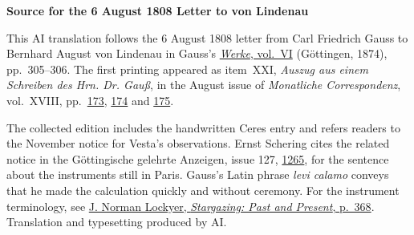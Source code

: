 \clearpage\thispagestyle{empty}
\begin{center}\textbf{Source for the 6 August 1808 Letter to von Lindenau}\end{center}
\noindent This AI translation follows the 6 August 1808 letter from Carl Friedrich Gauss to Bernhard August von Lindenau in Gauss’s \href{https://gdz.sub.uni-goettingen.de/id/PPN236007467}{\textit{Werke}, vol.~VI} (Göttingen, 1874), pp.~305--306. The first printing appeared as item~XXI, \textit{Auszug aus einem Schreiben des Hrn. Dr. Gauß}, in the August issue of \textit{Monatliche Correspondenz}, vol.~XVIII, pp.~\href{https://www.digitale-sammlungen.de/en/view/bsb10538609?page=193}{173}, \href{https://www.digitale-sammlungen.de/en/view/bsb10538609?page=194}{174} and \href{https://www.digitale-sammlungen.de/en/view/bsb10538609?page=195}{175}.
\par\medskip
The collected edition includes the handwritten Ceres entry and refers readers to the November notice for Vesta’s observations. Ernst Schering cites the related notice in the Göttingische gelehrte Anzeigen, issue 127, \href{https://manifests.sub.uni-goettingen.de/iiif/image/gdz:PPN319721507_1808:00001271/full/1600,/0/default.jpg}{1265}, for the sentence about the instruments still in Paris. Gauss’s Latin phrase \textit{levi calamo} conveys that he made the calculation quickly and without ceremony. For the instrument terminology, see \href{https://www.gutenberg.org/files/53172/old/53172-h/53172-h.htm#fig163}{J. Norman Lockyer, \textit{Stargazing: Past and Present}, p.~368}. Translation and typesetting produced by AI.
\clearpage
